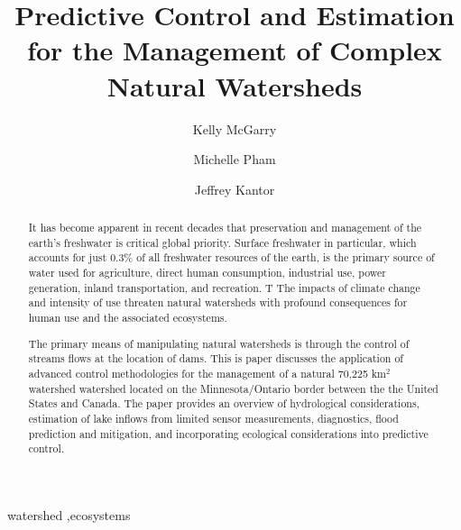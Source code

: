 \documentclass[preprint,times]{elsarticle}
\title{Predictive Control and Estimation for the Management of Complex Natural Watersheds}
\author{Kelly McGarry}
\author{Michelle Pham}
\author{Jeffrey Kantor\corref{cor1}\fnref{fn1}}
\begin{document}
\begin{abstract}
It has become apparent in recent decades that preservation and management of the earth's freshwater is critical global priority. Surface freshwater in particular, which  accounts for just 0.3\% of all freshwater resources of the earth, is the primary source of water used for agriculture, direct human consumption, industrial use, power generation, inland transportation, and recreation. T
The impacts of climate change and intensity of use threaten natural watersheds with profound consequences for human use and the associated ecosystems. 

The primary means of manipulating natural watersheds is through the control of streams flows at the location of dams. This is paper discusses the application of advanced control methodologies for the management of a natural 70,225 km$^2$ watershed watershed located on the Minnesota/Ontario border between the the United States and Canada. The paper provides an overview of hydrological considerations, estimation of lake inflows from limited sensor measurements, diagnostics, flood prediction and mitigation, and incorporating ecological considerations into predictive control.
\end{abstract}

\begin{keyword}
watershed \sep ecosystems 
\end{keyword}

\maketitle
\end{document}
